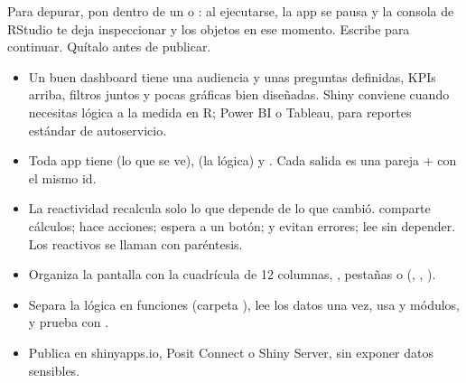\begin{consejo}
Para depurar, pon  dentro de un  o
: al ejecutarse, la app se pausa y la consola de RStudio
te deja inspeccionar  y los objetos en ese momento. Escribe
 para continuar. Quítalo antes de publicar.
\end{consejo}

\begin{resumen}
\begin{itemize}
  \item Un buen dashboard tiene una audiencia y unas preguntas definidas,
        KPIs arriba, filtros juntos y pocas gráficas bien diseñadas. Shiny
        conviene cuando necesitas lógica a la medida en R; Power BI o
        Tableau, para reportes estándar de autoservicio.
  \item Toda app tiene  (lo que se ve),  (la
        lógica) y . Cada salida es una pareja
         +  con el mismo id.
  \item La reactividad recalcula solo lo que depende de lo que cambió.
         comparte cálculos;  hace
        acciones;  espera a un botón; 
        y  evitan errores;  lee sin
        depender. Los reactivos se llaman con paréntesis.
  \item Organiza la pantalla con la cuadrícula de 12 columnas,
        , pestañas o 
        (, , ).
  \item Separa la lógica en funciones (carpeta ), lee los datos
        una vez, usa  y módulos, y prueba con
        .
  \item Publica en shinyapps.io, Posit Connect o Shiny Server, sin exponer
        datos sensibles.
\end{itemize}


\end{resumen}
